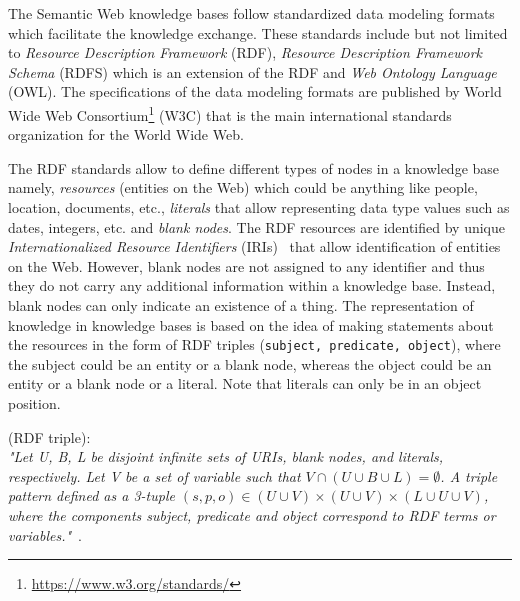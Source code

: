 The Semantic Web knowledge bases follow standardized data modeling formats which facilitate the knowledge exchange. These standards include but not limited to \textit{Resource Description Framework} (RDF),  \textit{Resource Description Framework Schema} (RDFS) which is an extension of the RDF and \textit{Web Ontology Language} (OWL). The specifications of the data modeling formats are published by World Wide Web Consortium\footnote{\url{https://www.w3.org/standards/}} (W3C) that is the main international standards organization for the World Wide Web.%

The RDF standards allow to define different types of nodes in a knowledge base namely, \textit{resources} (entities on the Web) which could be anything like people, location, documents, etc., \textit{literals} that allow representing data type values such as dates, integers, etc. and \textit{blank nodes}. %
The RDF resources are identified by unique \textit{Internationalized Resource Identifiers} (IRIs)~\cite{DBLP:journals/rfc/rfc3987} that allow identification of entities on the Web. However, blank nodes are not assigned to any identifier and thus they do not carry any additional information within a knowledge base. Instead, blank nodes can only indicate an existence of a thing. The representation of knowledge in knowledge bases is based on the idea of making statements about the resources in the form of RDF triples (\texttt{subject,  predicate, object}), where the subject could be an entity or a blank node, whereas the object could be an entity or a blank node or a literal. Note that literals can only be in an object position.
\theoremstyle{definition}
\begin{definition}{(RDF triple):\\}
\textit{"Let U, B, L be disjoint infinite sets of URIs, blank nodes, and literals, respectively. Let V be a set of variable such that $V \cap (U\cup B \cup L) = \emptyset$. A triple pattern defined as a 3-tuple $(s, p, o) \in (U\cup V) \times (U\cup V)\times (L\cup U \cup V)$, where the components subject, predicate and object correspond to RDF terms or variables."}~\cite{DBLP:phd/dnb/Deibe18}.
\end{definition}
\theoremstyle{definition}
